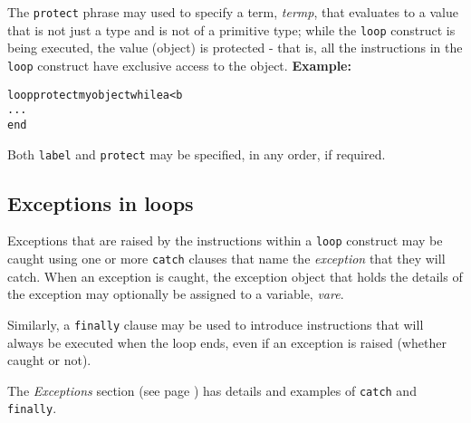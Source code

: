 The \texttt{protect} phrase may used to specify a term,
\emph{termp}, that evaluates to a value that is not just a type and
is not of a primitive type;
while the \texttt{loop} construct is being executed, the value (object)
is protected - that is, all the instructions in the \texttt{loop}
construct have exclusive access to the object.
 \textbf{Example:}
\begin{alltt}
loop protect myobject while a<b
  ...
  end
\end{alltt}
 
Both \texttt{label} and \texttt{protect} may be specified, in any order,
if required.
\subsection{Exceptions in loops}
 
Exceptions that are raised by the instructions within a \texttt{loop}
construct may be caught using one or more \texttt{catch} clauses that
name the \emph{exception} that they will catch.  When an exception is
caught, the exception object that holds the details of the exception may
optionally be assigned to a variable, \emph{vare}.
 
Similarly, a \texttt{finally} clause may be used to introduce
instructions that will always be executed when the loop ends, even if an
exception is raised (whether caught or not).
 
The  \emph{Exceptions} section (see page \pageref{refexcep})  has details and
examples of \texttt{catch} and \texttt{finally}.
